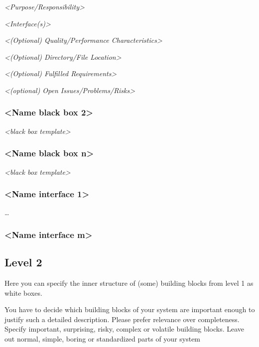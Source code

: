 \documentclass[]{article}
\begin{document}
\emph{\textless{}Purpose/Responsibility\textgreater{}}

\emph{\textless{}Interface(s)\textgreater{}}

\emph{\textless{}(Optional) Quality/Performance
Characteristics\textgreater{}}

\emph{\textless{}(Optional) Directory/File Location\textgreater{}}

\emph{\textless{}(Optional) Fulfilled Requirements\textgreater{}}

\emph{\textless{}(optional) Open Issues/Problems/Risks\textgreater{}}

\hypertarget{__name_black_box_2}{%
\subsubsection{\textless{}Name black box
2\textgreater{}}\label{__name_black_box_2}}

\emph{\textless{}black box template\textgreater{}}

\hypertarget{__name_black_box_n}{%
\subsubsection{\textless{}Name black box
n\textgreater{}}\label{__name_black_box_n}}

\emph{\textless{}black box template\textgreater{}}

\hypertarget{__name_interface_1}{%
\subsubsection{\textless{}Name interface
1\textgreater{}}\label{__name_interface_1}}

\ldots{}

\hypertarget{__name_interface_m}{%
\subsubsection{\textless{}Name interface
m\textgreater{}}\label{__name_interface_m}}

\hypertarget{_level_2}{%
\subsection{Level 2}\label{_level_2}}

Here you can specify the inner structure of (some) building blocks from
level 1 as white boxes.

You have to decide which building blocks of your system are important
enough to justify such a detailed description. Please prefer relevance
over completeness. Specify important, surprising, risky, complex or
volatile building blocks. Leave out normal, simple, boring or
standardized parts of your system
\end{document}
